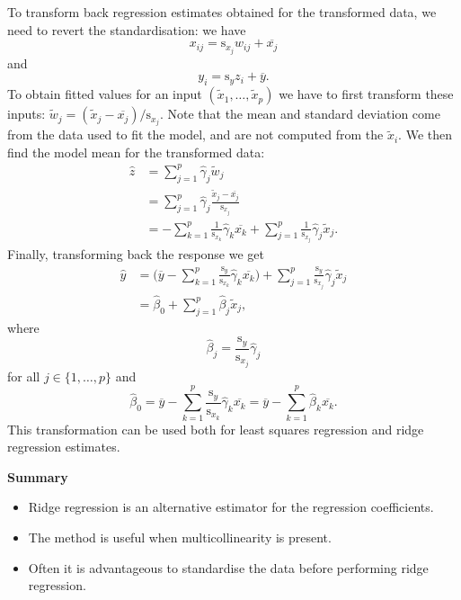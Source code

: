 \documentclass[
  a4paper,
]{article}
\providecommand{\tightlist}{%
  \setlength{\itemsep}{0pt}\setlength{\parskip}{0pt}}
\theoremstyle{definition}
\theoremstyle{definition}
\theoremstyle{definition}
\theoremstyle{definition}
\theoremstyle{remark}
\begin{document}
To transform back regression estimates obtained for the transformed data,
we need to revert the standardisation: we have
\begin{equation*}
  x_{ij}
  = \mathrm{s}_{x_j} w_{ij} + \overline{x_j}
\end{equation*}
and
\begin{equation*}
  y_i
  = \mathrm{s}_y z_i + \overline{y}.
\end{equation*}
To obtain fitted values for an input \((\tilde x_1, \ldots, \tilde x_p)\)
we have to first transform these inputs:
\(\tilde w_j = (\tilde x_j - \overline{x_j}) / \mathrm{s}_{x_j}\).
Note that the mean and standard deviation come from the data used to fit
the model, and are not computed from the \(\tilde x_i\).
We then find the model mean for the transformed data:
\begin{align*}
  \hat z
  &= \sum_{j=1}^p \hat\gamma_j \tilde w_j \\
  &= \sum_{j=1}^p \hat\gamma_j \frac{\tilde x_j - \overline{x_j}}{\mathrm{s}_{x_j}} \\
  &= - \sum_{k=1}^p \frac{1}{\mathrm{s}_{x_k}} \hat\gamma_k \overline{x_k}
    + \sum_{j=1}^p \frac{1}{\mathrm{s}_{x_j}} \hat\gamma_j \tilde x_j.
\end{align*}
Finally, transforming back the response we get
\begin{align*}
  \hat y
  &= \bigl( \overline{y} - \sum_{k=1}^p \frac{\mathrm{s}_y}{\mathrm{s}_{x_k}} \hat\gamma_k \overline{x_k} \bigr)
    + \sum_{j=1}^p \frac{\mathrm{s}_y}{\mathrm{s}_{x_j}} \hat\gamma_j \tilde x_j \\
  &= \hat\beta_0 + \sum_{j=1}^p \hat\beta_j \tilde x_j,
\end{align*}
where
\begin{equation*}
  \hat\beta_j
  = \frac{\mathrm{s}_y}{\mathrm{s}_{x_j}} \hat\gamma_j
\end{equation*}
for all \(j \in \{1, \ldots, p\}\) and
\begin{equation*}
  \hat\beta_0
  = \overline{y} - \sum_{k=1}^p \frac{\mathrm{s}_y}{\mathrm{s}_{x_k}} \hat\gamma_k \overline{x_k}
  = \overline{y} - \sum_{k=1}^p \hat\beta_k \overline{x_k}.
\end{equation*}
This transformation can be used both for least squares regression
and ridge regression estimates.

\textbf{Summary}

\begin{itemize}
\tightlist
\item
  Ridge regression is an alternative estimator for the regression coefficients.
\item
  The method is useful when multicollinearity is present.
\item
  Often it is advantageous to standardise the data before performing
  ridge regression.
\end{itemize}
\end{document}
